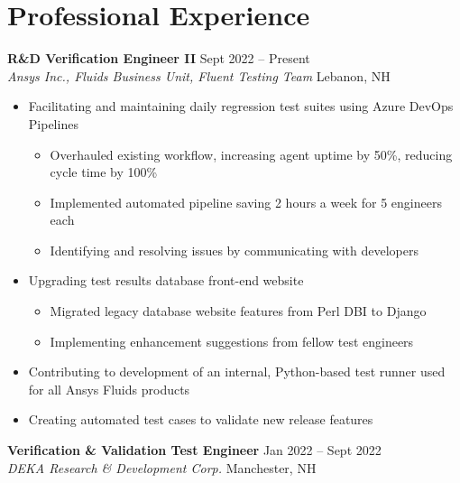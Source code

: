 \documentclass{my_resume}
\begin{document}
\section{Professional Experience}
\vspace{-0.25em}
{\textbf{R\&D Verification Engineer II}} \hfill {Sept 2022 -- Present}
\\{\em Ansys Inc., Fluids Business Unit, Fluent Testing Team} \hfill {Lebanon, NH}
\begin{itemize}[label={\tiny\raisebox{1ex}{\textbullet}}, noitemsep, leftmargin=0.75cm]
    \item Facilitating and maintaining daily regression test suites using Azure DevOps Pipelines
    \begin{itemize}[label={\tiny\raisebox{1ex}{\textbullet}}, noitemsep, leftmargin=0.75cm]
        \item Overhauled existing workflow, increasing agent uptime by 50\%, reducing cycle time by 100\%
        \item Implemented automated pipeline saving 2 hours a week for 5 engineers each 
        \item Identifying and resolving issues by communicating with developers
    \end{itemize}
    \item Upgrading test results database front-end website
    \begin{itemize}[label={\tiny\raisebox{1ex}{\textbullet}}, noitemsep]
        \item Migrated legacy database website features from Perl DBI to Django 
        \item Implementing enhancement suggestions from fellow test engineers
    \end{itemize}
    \item Contributing to development of an internal, Python-based test runner used for all Ansys Fluids products
    \item Creating automated test cases to validate new release features
\end{itemize}
\smallskip
{\textbf{Verification \& Validation Test Engineer}} \hfill {Jan 2022 -- Sept 2022}
\\{\em DEKA Research \& Development Corp.} \hfill {Manchester, NH}
\end{document}
